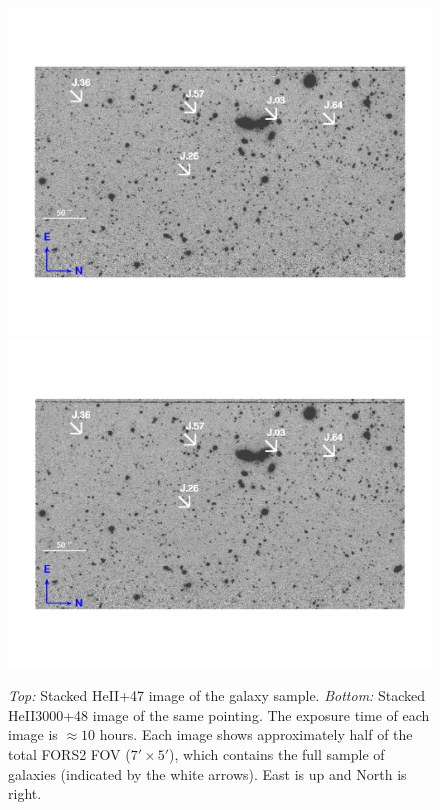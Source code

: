 \documentclass[twocolumn]{aastex62}
\begin{document}
\begin{figure}[ht!]
\centering
\includegraphics[scale=.61]{figure4a.pdf}
\includegraphics[scale=.61]{figure4b.pdf}
\caption{\emph{Top:} Stacked HeII+47 image of the galaxy sample. \emph{Bottom:} Stacked HeII3000+48 image of the same pointing. The exposure time of each image is $\approx 10$ hours. Each image shows approximately half of the total FORS2 FOV ($7' \times 5'$), which contains the full sample of galaxies (indicated by the white arrows). East is up and North is right.
\label{fig:stacked_image}}
\end{figure}
\end{document}
